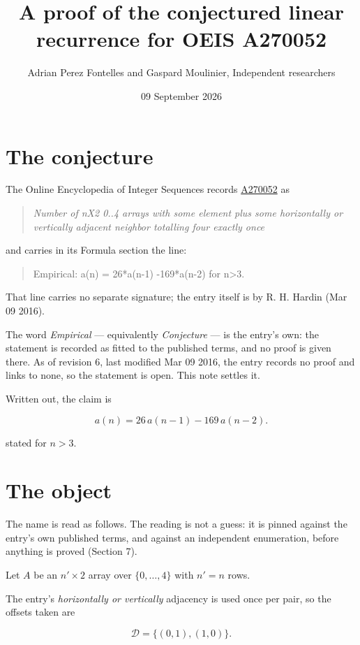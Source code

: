 \documentclass[11pt]{article}
\title{A proof of the conjectured linear recurrence for OEIS A270052}
\author{Adrian Perez Fontelles and Gaspard Moulinier, Independent researchers}
\date{09 September 2026}
\theoremstyle{definition}
\begin{document}
\maketitle
\section{The conjecture}

The Online Encyclopedia of Integer Sequences records \href{https://oeis.org/A270052}{A270052} as

\begin{quote}\itshape Number of nX2 0..4 arrays with some element plus some horizontally or vertically adjacent neighbor totalling four exactly once\end{quote}

and carries in its Formula section the line:

\begin{quote}\ttfamily Empirical: a(n) = 26*a(n-1) -169*a(n-2) for n>3.\end{quote}

That line carries no separate signature; the entry itself is by R. H. Hardin (Mar 09 2016).

The word {\itshape Empirical} --- equivalently {\itshape Conjecture} --- is the entry's own: the statement is recorded as fitted to the published terms, and no proof is given there. As of revision 6, last modified Mar 09 2016, the entry records no proof and links to none, so the statement is open. This note settles it.

Written out, the claim is

\[a(n) = 26\,a(n-1) - 169\,a(n-2).\]

stated for $n > 3$.

\section{The object}

The name is read as follows. The reading is not a guess: it is pinned against the entry's own published terms, and against an independent enumeration, before anything is proved (Section 7).

Let $A$ be an $n' \times 2$ array over $\{0,\dots,4\}$ with $n' = n$ rows.

The entry's {\itshape horizontally or vertically} adjacency is used once per pair, so the offsets taken are

\[\mathcal{D} = \{(0,1), (1,0)\}.\]
\end{document}

